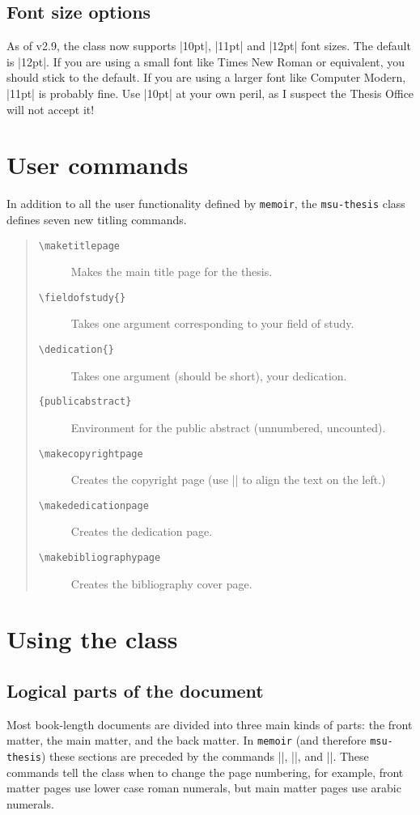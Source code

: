 \documentclass[11pt]{article}
\newcommand*\bs{\textbackslash}
\newcommand*{\pkg}[1]{\texttt{#1}\xspace}
\begin{document}
\subsection{Font size options}\label{fontsize}
As of v2.9, the class now supports |10pt|, |11pt| and |12pt| font sizes. The default is |12pt|. If you are using a small font like Times New Roman or equivalent, you should stick to the default. If you are using a larger font like Computer Modern, |11pt| is probably fine. Use |10pt| at your own peril, as I suspect the Thesis Office will not accept it!

\section{User commands}
In addition to all the user functionality defined by \pkg{memoir}, the \pkg{msu-thesis} class defines seven new titling commands. 
\begin{quote}
\begin{description}
\item[\texttt{\bs maketitlepage}] Makes the main title page for the thesis.
\item[\texttt{\bs fieldofstudy\{\}}] Takes one argument corresponding to your field of study.
\item[\texttt{\bs dedication\{\}}] Takes one argument (should be short), your dedication.
\item[\texttt{\{publicabstract\}}] Environment for the public abstract (unnumbered, uncounted).
\item[\texttt{\bs makecopyrightpage}] Creates the copyright page (use |\makecopyrightpage*| to align the text on the left.)
\item[\texttt{\bs makededicationpage}] Creates the dedication page.
\item[\texttt{\bs makebibliographypage}] Creates the bibliography cover page.
\end{description}
\end{quote}
\section{Using the class}
\subsection{Logical parts of the document}

Most book-length documents are divided into three main kinds of parts: the front matter, the main matter, and the back matter.  In \pkg{memoir} (and therefore \pkg{msu-thesis}) these sections are preceded by the commands |\frontmatter|, |\mainmatter|, and |\backmatter|.  These commands tell the class when to change the page numbering, for example, front matter pages  use lower case roman numerals, but main matter pages use arabic numerals.
\end{document}
